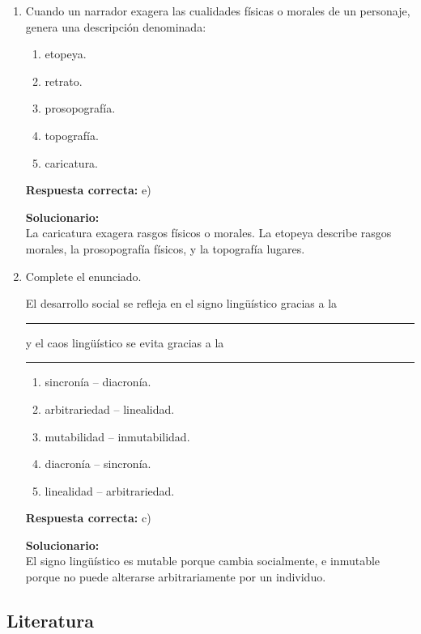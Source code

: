 \begin{enumerate}
	\vspace{6mm}
	
	\item Cuando un narrador exagera las cualidades físicas o morales de un personaje, genera una descripción denominada:
	\begin{enumerate}[label=\alph*)]
		\item etopeya.
		\item retrato.
		\item prosopografía.
		\item topografía.
		\item caricatura.
	\end{enumerate}
	\textbf{Respuesta correcta:} e)
	
	\vspace{2mm}
	\textbf{Solucionario:}\\
	La caricatura exagera rasgos físicos o morales. La etopeya describe rasgos morales, la prosopografía físicos, y la topografía lugares.
	
	\vspace{6mm}
	
	\item Complete el enunciado.
	
	El desarrollo social se refleja en el signo lingüístico gracias a la \rule{2cm}{0.15mm} y el caos lingüístico se evita gracias a la \rule{2cm}{0.15mm}
	\begin{enumerate}[label=\alph*)]
		\item sincronía -- diacronía.
		\item arbitrariedad -- linealidad.
		\item mutabilidad -- inmutabilidad.
		\item diacronía -- sincronía.
		\item linealidad -- arbitrariedad.
	\end{enumerate}
	\textbf{Respuesta correcta:} c)
	
	\vspace{2mm}
	\textbf{Solucionario:}\\
	El signo lingüístico es mutable porque cambia socialmente, e inmutable porque no puede alterarse arbitrariamente por un individuo.
	
	\vspace{6mm}
	
\end{enumerate}

\subsection*{Literatura}

